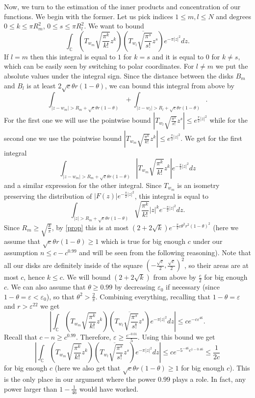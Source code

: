 \documentclass[12pt]{amsart}
\numberwithin{equation}{section}
\newcommand{\Cm}{\mathbb{C}}
\newcommand{\eps}{\varepsilon}
\begin{document}
Now, we turn to the estimation of the inner products and concentration of our functions. We begin with the former. Let us pick indices $1\le m, l\le N$ and degrees $0 \le k \le \pi R_m^2$, $0\le s \le \pi R_l^2$. We want to bound 
$$\int_\Cm \left(T_{w_m}\sqrt{\frac{\pi^k}{k!}}z^k\right)\left( \overline{T_{w_l}\sqrt{\frac{\pi^s}{s!}}z^s}\right)e^{-\pi |z|^2}dz.$$
If $l = m$ then this integral is equal to $1$ for $k = s$ and it is equal to $0$ for $k\neq s$, which can be easily seen by switching to polar coordinates. For $l\neq m$ we put the absolute values under the integral sign. Since the distance between the disks $B_m$ and $B_l$ is at least $2\sqrt{c}\theta r(1-\theta)$, we can bound this integral from above by
$$\int_{|z-w_m|>R_m + \sqrt{c}\theta r(1-\theta)} + \int_{|z-w_l| > R_l + \sqrt{c}\theta r(1-\theta)}.$$
For the first one we will use the pointwise bound $\left|T_{w_l}\sqrt{\frac{\pi^s}{s!}}z^s\right|\le e^{\frac{\pi}{2}|z|^2}$ while for the second one we use the pointwise bound $\left|T_{w_m}\sqrt{\frac{\pi^k}{k!}}z^k\right| \le e^{\frac{\pi}{2}|z|^2}$. We get for the first integral
$$\int_{|z-w_m|>R_m + \sqrt{c}\theta r(1-\theta)}\left|T_{w_m}\sqrt{\frac{\pi^k}{k!}}z^k\right| e^{-\frac{\pi}{2}|z|^2}dz$$
and a similar expression for the other integral. Since $T_{w_m}$ is an isometry preserving the distribution of $|F(z)|e^{-\frac{\pi}{2}|z|^2}$, this integral is equal to 
$$\int_{|z| > R_m + \sqrt{c}\theta r(1-\theta)} \sqrt{\frac{\pi^k}{k!}}|z|^k e^{-\frac{\pi}{2}|z|^2}dz.$$
Since $R_m \ge \sqrt{\frac{k}{\pi}}$, by \eqref{prop} this is at most $(2+2\sqrt{k})e^{-\frac{\pi}{2} c \theta^2 r^2(1-\theta)^2}$ (here we assume that $\sqrt{c}\theta r(1-\theta)\ge 1$ which is true for big enough $c$ under our assumption $n \le c - c^{0.99}$ and will be seen from the following reasoning). Note that all our disks are definitely inside of the square $\left(-\frac{\sqrt{c}}{2},\frac{\sqrt{c}}{2}\right)^2$, so their areas are at most $c$, hence $k\le c$. We will bound $(2+2\sqrt{k})$ from above by $\frac{c}{2}$ for big enough $c$. We can also assume that $\theta \ge 0.99$ by decreasing $\eps_0$ if necessary (since $1-\theta = \eps < \eps_0$), so that $\theta^2 > \frac{2}{\pi}$. Combining everything, recalling that $1-\theta = \eps$ and $r > \eps^{22}$ we get
$$\left|\int_\Cm \left(T_{w_m}\sqrt{\frac{\pi^k}{k!}}z^k\right)\left( \overline{T_{w_l}\sqrt{\frac{\pi^s}{s!}}z^s}\right)e^{-\pi |z|^2}dz\right| \le ce^{-c\eps^{46}}.$$
Recall that $c-n \ge c^{0.99}$. Therefore, $\eps \ge \frac{c^{-0.01}}{5}$. Using this bound we get
$$\left|\int_\Cm \left(T_{w_m}\sqrt{\frac{\pi^k}{k!}}z^k\right)\left( \overline{T_{w_l}\sqrt{\frac{\pi^s}{s!}}z^s}\right)e^{-\pi |z|^2}dz\right| \le ce^{-5^{-46}c^{1-0.46}} \le \frac{1}{2c}$$
for big enough $c$ (here we also get that $\sqrt{c}\theta r(1-\theta)\ge 1$ for big enough $c$). This is the only place in our argument where the power $0.99$ plays a role. In fact, any power larger than $1-\frac{1}{46}$ would have worked.
\end{document}
